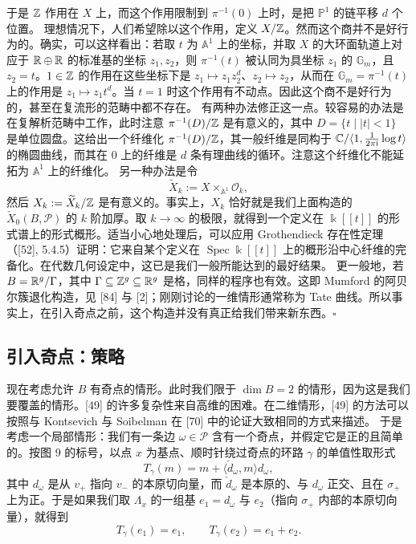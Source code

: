 \begin{example}
于是 $\mathbb{Z}$ 作用在 $X$ 上，而这个作用限制到 $\pi^{-1}(0)$ 上时，是把 $\mathbb{P}^1$ 的链平移 $d$ 个位置。
理想情况下，人们希望除以这个作用，定义 $X/\mathbb{Z}$。然而这个商并不是好行为的。确实，可以这样看出：若取 $t$ 为 $\mathbb{A}^1$ 上的坐标，并取 $X$ 的大环面轨道上对应于 $\mathbb{R}\oplus\mathbb{R}$ 的标准基的坐标 $z_1,z_2$，则 $\pi^{-1}(t)$ 被认同为具坐标 $z_1$ 的 $\mathbb{G}_m$，且 $z_2=t$。$1\in\mathbb{Z}$ 的作用在这些坐标下是 $z_1\mapsto z_1z_2^d$、$z_2\mapsto z_2$，从而在 $\mathbb{G}_m=\pi^{-1}(t)$ 上的作用是 $z_1\mapsto z_1t^d$。当 $t=1$ 时这个作用有不动点。因此这个商不是好行为的，甚至在复流形的范畴中都不存在。
有两种办法修正这一点。较容易的办法是在复解析范畴中工作，此时注意 $\pi^{-1}(D)/\mathbb{Z}$ 是有意义的，其中 $D=\{t\mid|t|<1\}$ 是单位圆盘。这给出一个纤维化 $\pi^{-1}(D)/\mathbb{Z}$，其一般纤维是同构于 $\mathbb{C}/\langle1,\frac{1}{2\pi\mathrm{i}}\log t\rangle$ 的椭圆曲线，而其在 $0$ 上的纤维是 $d$ 条有理曲线的循环。注意这个纤维化不能延拓为 $\mathbb{A}^1$ 上的纤维化。
另一种办法是令
\[
\widetilde X_k:=X\times_{\mathbb{A}^1}\mathcal{O}_k,
\]
然后 $X_k:=\widetilde X_k/\mathbb{Z}$ 是有意义的。事实上，$X_k$ 恰好就是我们上面构造的 $\check X_0(B,\mathcal{P})$ 的 $k$ 阶加厚。取 $k\to\infty$ 的极限，就得到一个定义在 $\Bbbk[[t]]$ 的形式谱上的形式概形。适当小心地处理后，可以应用 Grothendieck 存在性定理（[52], 5.4.5）证明：它来自某个定义在 $\operatorname{Spec}\Bbbk[[t]]$ 上的概形沿中心纤维的完备化。在代数几何设定中，这已是我们一般所能达到的最好结果。
更一般地，若 $B=\mathbb{R}^g/\Gamma$，其中 $\Gamma\subseteq\mathbb{Z}^g\subseteq\mathbb{R}^g$ 是格，同样的程序也有效。这即 Mumford 的阿贝尔簇退化构造，见 [84] 与 [2]；刚刚讨论的一维情形通常称为 Tate 曲线。所以事实上，在引入奇点之前，这个构造并没有真正给我们带来新东西。\hfill$\square$
\end{example}

\subsection{引入奇点：策略}
现在考虑允许 $B$ 有奇点的情形。此时我们限于 $\dim B=2$ 的情形，因为这是我们要覆盖的情形。[49] 的许多复杂性来自高维的困难。在二维情形，[49] 的方法可以按照与 Kontsevich 与 Soibelman 在 [70] 中的论证大致相同的方式来描述。
于是考虑一个局部情形：我们有一条边 $\omega\in\mathcal{P}$ 含有一个奇点，并假定它是正的且简单的。按图 9 的标号，以点 $x$ 为基点、顺时针绕过奇点的环路 $\gamma$ 的单值性取形式
\[
T_\gamma(m)=m+\langle\check d_\omega,m\rangle d_\omega,
\]
其中 $d_\omega$ 是从 $v_+$ 指向 $v_-$ 的本原切向量，而 $\check d_\omega$ 是本原的、与 $d_\omega$ 正交、且在 $\sigma_+$ 上为正。于是如果我们取 $\Lambda_x$ 的一组基 $e_1=d_\omega$ 与 $e_2$（指向 $\sigma_+$ 内部的本原切向量），就得到
\[
T_\gamma(e_1)=e_1,\qquad T_\gamma(e_2)=e_1+e_2.
\]

